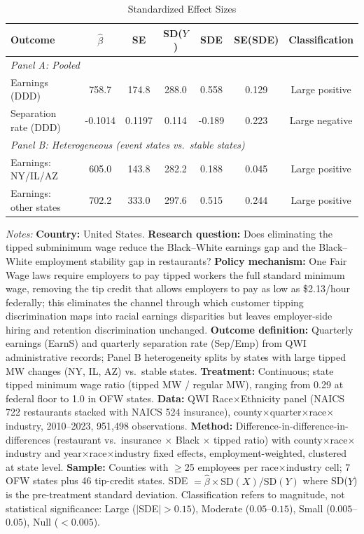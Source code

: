 
\begin{table}[t]
\centering
\caption{Standardized Effect Sizes}
\label{tab:sde}
\begin{tabular}{lcccccc}
\toprule
Outcome & $\hat{\beta}$ & SE & SD($Y$) & SDE & SE(SDE) & Classification \\
\midrule
\multicolumn{7}{l}{\textit{Panel A: Pooled}} \\[3pt]
Earnings (DDD) & 758.7 & 174.8 & 288.0 & 0.558 & 0.129 & Large positive \\
Separation rate (DDD) & -0.1014 & 0.1197 & 0.114 & -0.189 & 0.223 & Large negative \\[6pt]
\multicolumn{7}{l}{\textit{Panel B: Heterogeneous (event states vs.\ stable states)}} \\[3pt]
Earnings: NY/IL/AZ & 605.0 & 143.8 & 282.2 & 0.188 & 0.045 & Large positive \\
Earnings: other states & 702.2 & 333.0 & 297.6 & 0.515 & 0.244 & Large positive \\
\bottomrule
\end{tabular}
\begin{tablenotes}
\small
\item \textit{Notes:} \textbf{Country:} United States. \textbf{Research question:} Does eliminating the tipped subminimum wage reduce the Black--White earnings gap and the Black--White employment stability gap in restaurants? \textbf{Policy mechanism:} One Fair Wage laws require employers to pay tipped workers the full standard minimum wage, removing the tip credit that allows employers to pay as low as \$2.13/hour federally; this eliminates the channel through which customer tipping discrimination maps into racial earnings disparities but leaves employer-side hiring and retention discrimination unchanged. \textbf{Outcome definition:} Quarterly earnings (EarnS) and quarterly separation rate (Sep/Emp) from QWI administrative records; Panel B heterogeneity splits by states with large tipped MW changes (NY, IL, AZ) vs.~stable states. \textbf{Treatment:} Continuous; state tipped minimum wage ratio (tipped MW / regular MW), ranging from 0.29 at federal floor to 1.0 in OFW states. \textbf{Data:} QWI Race$\times$Ethnicity panel (NAICS 722 restaurants stacked with NAICS 524 insurance), county$\times$quarter$\times$race$\times$industry, 2010--2023, 951,498 observations. \textbf{Method:} Difference-in-difference-in-differences (restaurant vs.~insurance $\times$ Black $\times$ tipped ratio) with county$\times$race$\times$industry and year$\times$race$\times$industry fixed effects, employment-weighted, clustered at state level. \textbf{Sample:} Counties with $\geq$25 employees per race$\times$industry cell; 7 OFW states plus 46 tip-credit states. SDE $= \hat{\beta} \times \text{SD}(X) / \text{SD}(Y)$ where SD($Y$) is the pre-treatment standard deviation. Classification refers to magnitude, not statistical significance: Large ($|$SDE$| > 0.15$), Moderate ($0.05$--$0.15$), Small ($0.005$--$0.05$), Null ($< 0.005$).
\end{tablenotes}
\end{table}
